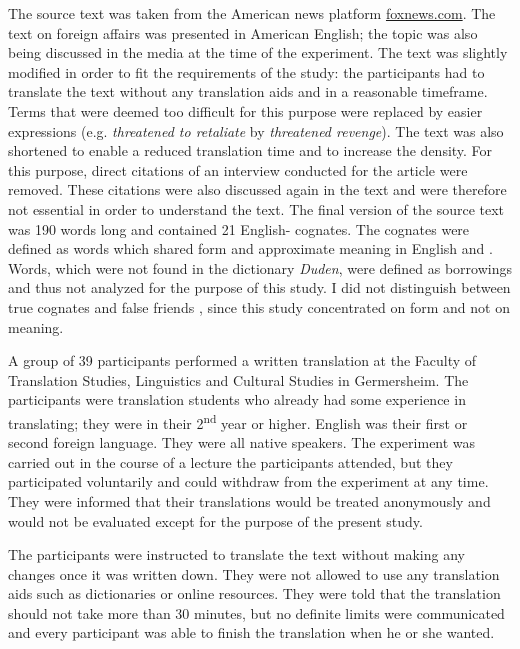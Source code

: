 \documentclass[output=paper]{LSP/langsci}
\begin{document}
The source text was taken from the American news platform \href{http://foxnews.com}{foxnews.com}. The text on foreign affairs was presented in American English; the topic was also being discussed in the  media at the time of the experiment. The text was slightly modified in order to fit the requirements of the study: the participants had to translate the text without any translation aids and in a reasonable timeframe. Terms that were deemed too difficult for this purpose were replaced by easier expressions (e.g. \textit{threatened to retaliate} by \textit{threatened revenge}). The text was also shortened to enable a reduced translation time and to increase the  density. For this purpose, direct citations of an interview conducted for the article were removed. These citations were also discussed again in the text and were therefore not essential in order to understand the text. The final version of the source text was 190 words long and contained 21 English- cognates. The cognates were defined as words which shared form and approximate meaning in English and . Words, which were not found in the  dictionary \textit{Duden}, were defined as borrowings and thus not analyzed for the purpose of this study. I did not distinguish between true cognates and false friends \citep{Stamenov2010}, since this study concentrated on form and not on meaning. 

A group of 39 participants performed a written translation at the Faculty of Translation Studies, Linguistics and Cultural Studies in Germersheim. The participants were translation students who already had some experience in translating; they were in their 2\textsuperscript{nd} year or higher. English was their first or second foreign language. They were all  native speakers. The experiment was carried out in the course of a lecture the participants attended, but they participated voluntarily and could withdraw from the experiment at any time. They were informed that their translations would be treated anonymously and would not be evaluated except for the purpose of the present study. 

The participants were instructed to translate the text without making any changes once it was written down. They were not allowed to use any translation aids such as dictionaries or online resources. They were told that the translation should not take more than 30 minutes, but no definite limits were communicated and every participant was able to finish the translation when he or she wanted.
\end{document}
